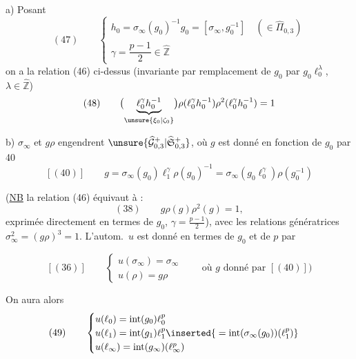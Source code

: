  a) Posant
\[
(47)\qquad
\begin{cases}
h_0=\sigma_\infty(g_0)^{-1}g_0=[\sigma_\infty,g_0^{-1}]
   \quad(\in\widehat{\Pi}_{0,3})\\
\gamma=\dfrac{p-1}{2}\in\widehat{\mathbb Z}
\end{cases}
\]
on a la relation (46) ci-dessus (invariante par remplacement de $g_0$ par
$g_0\ell_0^\lambda$, $\lambda\in\widehat{\mathbb Z}$)
\[
(48)\qquad
\bigl(\underbrace{\ell_0^\gamma h_0^{-1}}_{\unsure{\xi_0|\zeta_0}}\bigr)
\rho(\ell_0^\gamma h_0^{-1})\rho^2(\ell_0^\gamma h_0^{-1})=1
\]

 b) $\sigma_\infty$ et $g\rho$ engendrent 
$\unsure{\widehat{\mathcal G}_{0,3}^{+}|\widehat{\mathfrak S}_{0,3}^{+}}$,
où $g$ est donné en fonction de $g_0$ par 40
\[
[(40)]\qquad
g=\sigma_\infty(g_0)\ell_1^\gamma\rho(g_0)^{-1}
=\sigma_\infty(g_0\ell_0^\gamma)\rho(g_0^{-1})
\]

(\uline{NB} la relation (46) équivaut à :
\[
(38)\qquad g\rho(g)\rho^2(g)=1,
\]
exprimée directement en termes de $g_0$, $\gamma=\frac{p-1}{2}$),
avec les relations génératrices $\sigma_\infty^2=(g\rho)^3=1$.
L'autom.\ $u$ est donné en termes de $g_0$ et de $p$ par


\[
[(36)]\qquad
\begin{cases}
u(\sigma_\infty)=\sigma_\infty\\
u(\rho)=g\rho
\end{cases}
\qquad\text{où }g\text{ donné par }[(40)])
\]

On aura alors
\[
(49)\qquad
\begin{cases}
u(\ell_0)=\operatorname{int}(g_0)\ell_0^p\\
u(\ell_1)=\operatorname{int}(g_1)\ell_1^p
 \inserted{{}=\operatorname{int}(\sigma_\infty(g_0))(\ell_1^p)}\\
u(\ell_\infty)=\operatorname{int}(g_\infty)(\ell_\infty^p)
\end{cases}
\]

